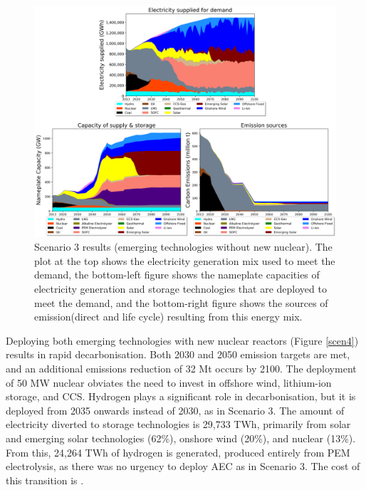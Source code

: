 \begin{figure}[H] 
\centering
\includegraphics[scale=0.5]{figures/newtechs_nonuc}
\caption{Scenario 3 results (emerging technologies without new nuclear). The plot at the top shows the electricity generation mix used to meet the demand, the bottom-left figure shows the nameplate capacities of electricity generation and storage technologies that are deployed to meet the demand, and the bottom-right figure shows the sources of emission(direct and life cycle) resulting from this energy mix.}
\label{scen3}
\end{figure}

Deploying both emerging technologies with new nuclear reactors (Figure \ref{scen4}) results in rapid decarbonisation. Both 2030 and 2050 emission targets are met, and an additional emissions reduction of 32 Mt occurs by 2100. The deployment of 50 MW nuclear obviates the need to invest in offshore wind, lithium-ion storage, and \gls{CCS}. Hydrogen plays a significant role in decarbonisation, but it is deployed from 2035 onwards instead of 2030, as in Scenario 3. The amount of electricity diverted to storage technologies is 29,733 TWh, primarily from solar and emerging solar technologies (62\%), onshore wind (20\%), and nuclear (13\%). From this, 24,264 TWh of hydrogen is generated, produced entirely from PEM electrolysis, as there was no urgency to deploy \gls{AEC} as in Scenario 3. The cost of this transition is   .

